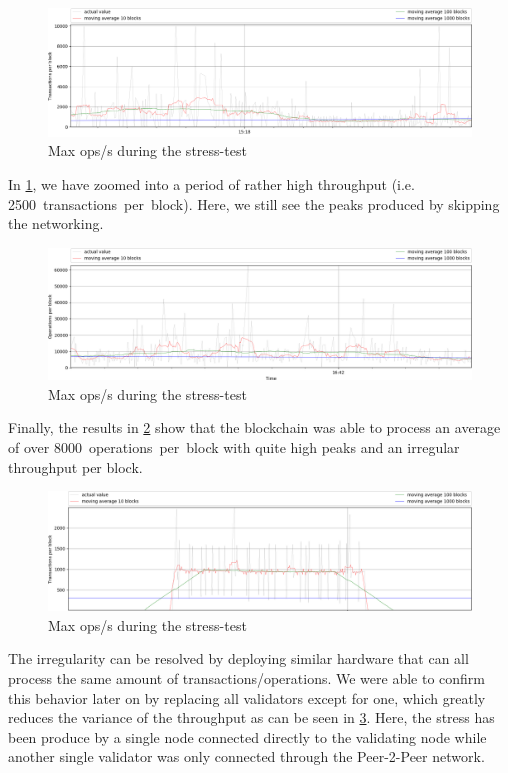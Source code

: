 \begin{figure}[!htp]
 \centering
 \includegraphics[width=\linewidth]{figures/stress-test-max-tps.png}
 \caption{Max ops/s during the stress-test}
 \label{fig:tps}
\end{figure}

In \cref{fig:tps}, we have zoomed into a period of rather high throughput (i.e.
\SI{2500}{transactions per block}). Here, we still see the peaks produced by
skipping the networking.

\begin{figure}[!htp]
 \centering
 \includegraphics[width=\linewidth]{figures/stress-test-max-ops.png}
 \caption{Max ops/s during the stress-test}
 \label{fig:ops}
\end{figure}

Finally, the results in \cref{fig:ops} show that the blockchain was able to
process an average of over \SI{8000}{operations per block} with quite high
peaks and an irregular throughput per block.

\begin{figure}[!htp]
 \centering
 \includegraphics[width=\linewidth]{figures/stress-test-constant-load.png}
 \caption{Max ops/s during the stress-test}
 \label{fig:ops-const}
\end{figure}

The irregularity can be resolved by deploying similar hardware that can all
process the same amount of transactions/operations. We were able to confirm
this behavior later on by replacing all validators except for one, which
greatly reduces the variance of the throughput as can be seen in
\cref{fig:ops-const}. Here, the stress has been produce by a single node
connected directly to the validating node while another single validator was
only connected through the Peer-2-Peer network.
